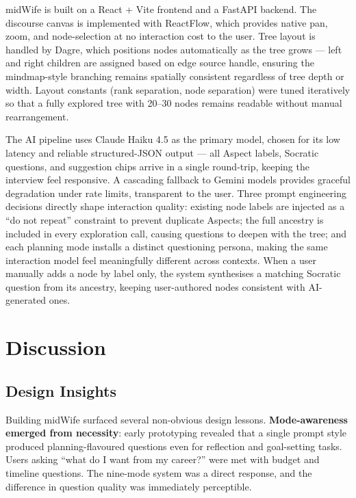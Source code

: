 \documentclass[sigconf]{acmart}
\begin{document}
midWife is built on a React + Vite frontend and a FastAPI backend. %
The discourse canvas is implemented with ReactFlow, which provides native pan, zoom, and
node-selection at no interaction cost to the user. Tree layout is handled by Dagre, which
positions nodes automatically as the tree grows --- left and right children are assigned
based on edge source handle, ensuring the mindmap-style branching remains spatially
consistent regardless of tree depth or width. Layout constants (rank separation, node
separation) were tuned iteratively so that a fully explored tree with 20--30 nodes
remains readable without manual rearrangement.

The AI pipeline uses Claude Haiku 4.5 as the primary model, chosen for its low latency
and reliable structured-JSON output --- all Aspect labels, Socratic questions, and
suggestion chips arrive in a single round-trip, keeping the interview feel responsive.
A cascading fallback to Gemini models provides graceful degradation under rate limits,
transparent to the user. Three prompt engineering decisions directly shape interaction quality: existing node
labels are injected as a ``do not repeat'' constraint to prevent duplicate Aspects;
the full ancestry is included in every exploration call, causing questions to deepen
with the tree; and each planning mode installs a distinct questioning persona, making
the same interaction model feel meaningfully different across contexts. When a user
manually adds a node by label only, the system synthesises a matching Socratic
question from its ancestry, keeping user-authored nodes consistent with AI-generated ones.


\section{Discussion}

\subsection{Design Insights}
Building midWife surfaced several non-obvious design lessons. \textbf{Mode-awareness
emerged from necessity}: early prototyping revealed that a single prompt style produced
planning-flavoured questions even for reflection and goal-setting tasks. Users asking
``what do I want from my career?'' were met with budget and timeline questions. The
nine-mode system was a direct response, and the difference in question quality was
immediately perceptible.
\end{document}
